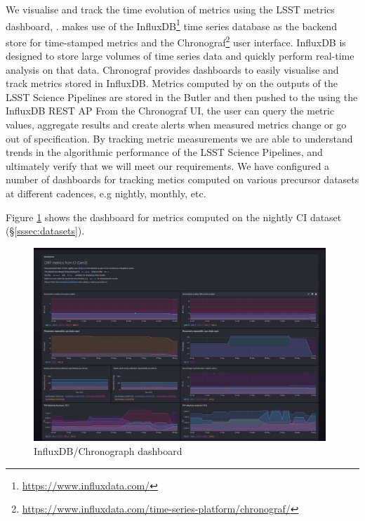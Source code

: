 We visualise and track the time evolution of \faro metrics using the LSST metrics dashboard, \squash\cite{SQR-009}. 
\squash makes use of the InfluxDB\footnote{\url{https://www.influxdata.com/}} time series database as the backend store for time-stamped metrics and the Chronograf\footnote{\url{https://www.influxdata.com/time-series-platform/chronograf/}} user interface.
InfluxDB is designed to store large volumes of time series data and quickly perform real-time analysis on that data.
Chronograf provides dashboards to easily visualise and track metrics stored in InfluxDB. 
Metrics computed by \faro on the outputs of the LSST Science Pipelines are stored in the Butler and then pushed to the \squash using  the InfluxDB REST AP
From the Chronograf UI, the user can query the metric values, aggregate results and create alerts when measured metrics change or go out of specification. 
By tracking metric measurements we are able to understand trends in the algorithmic performance of the LSST Science Pipelines, and ultimately verify that we will meet our requirements.
We have configured a number of dashboards for tracking \faro metics computed on various precursor datasets at different cadences, e.g nightly, monthly, etc. 

Figure \ref{fig:squash_metrics_ci} shows the dashboard for \faro metrics computed on the nightly CI dataset (\S \ref{sssec:datasets}). 
\begin{figure}[h]

  \par\medskip 
  \includegraphics[width=0.98\textwidth]{figures/squash-dashboard-ci.png}
  \par\medskip   
  \caption{InfluxDB/Chronograph dashboard}
  \label{fig:squash_metrics_ci}
\end{figure}


